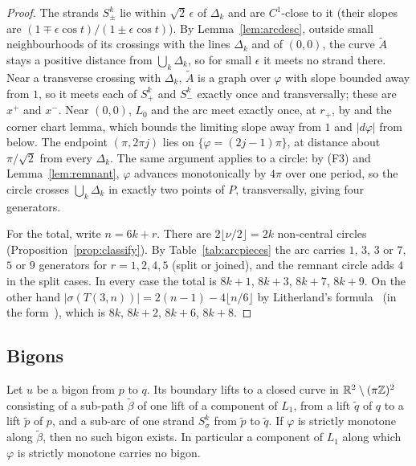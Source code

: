 \begin{proof}
The strands $S^k_\pm$ lie within $\sqrt2\,\epsilon$ of $\Delta_k$ and are $C^1$-close to it (their slopes are
$(1\mp\epsilon\cos t)/(1\pm\epsilon\cos t)$). By Lemma~\ref{lem:arcdesc}, outside small neighbourhoods of its crossings
with the lines $\Delta_k$ and of $(0,0)$, the curve $\tilde A$ stays a positive distance from $\bigcup_k\Delta_k$, so for
small $\epsilon$ it meets no strand there. Near a transverse crossing with $\Delta_k$, $\tilde A$ is a graph over
$\varphi$ with slope bounded away from $1$, so it meets each of $S^k_+$ and $S^k_-$ exactly once and
transversally; these are $x^+$ and $x^-$. Near $(0,0)$, $L_0$ and the arc meet exactly once, at $r_+$, by
\cite[Lemma~5.1]{HHK2} and the corner chart lemma, which bounds the limiting slope away from $1$ and $|d\varphi|$
from below. The endpoint $(\pi,2\pi j)$ lies on $\{\varphi=(2j-1)\pi\}$, at distance about $\pi/\sqrt2$ from every
$\Delta_k$. The same argument applies to a circle: by (F3) and Lemma~\ref{lem:remnant}, $\varphi$ advances
monotonically by $4\pi$ over one period, so the circle crosses $\bigcup_k\Delta_k$ in exactly two points of $P$,
transversally, giving four generators.

For the total, write $n=6k+r$. There are $2\lfloor\nu/2\rfloor=2k$ non-central circles
(Proposition~\ref{prop:classify}). By Table~\ref{tab:arcpieces} the arc carries $1$, $3$, $3$ or $7$, $5$ or $9$
generators for $r=1,2,4,5$ (split or joined), and the remnant circle adds $4$ in the split cases. In every case
the total is $8k+1$, $8k+3$, $8k+7$, $8k+9$. On the other hand $|\sigma(T(3,n))|=2(n-1)-4\lfloor n/6\rfloor$ by
Litherland's formula~\cite{Litherland} (in the form~\cite[Lemma~2.3]{W26}), which is $8k$, $8k+2$, $8k+6$, $8k+8$.
\end{proof}

\subsection{Bigons}\label{ss:bigons}

\begin{lemma}\label{lem:bigonlift}
Let $u$ be a bigon from $p$ to $q$. Its boundary lifts to a closed curve in $\mathbb{R}^2\setminus(\pi\mathbb{Z})^2$ consisting of
a sub-path $\tilde\beta$ of one lift of a component of $L_1$, from a lift $\tilde q$ of $q$ to a lift $\tilde p$ of $p$, and
a sub-arc of one strand $S^k_\sigma$ from $\tilde p$ to $\tilde q$. If $\varphi$ is strictly monotone along $\tilde\beta$, then no
such bigon exists. In particular a component of $L_1$ along which $\varphi$ is strictly monotone carries no
bigon.
\end{lemma}

